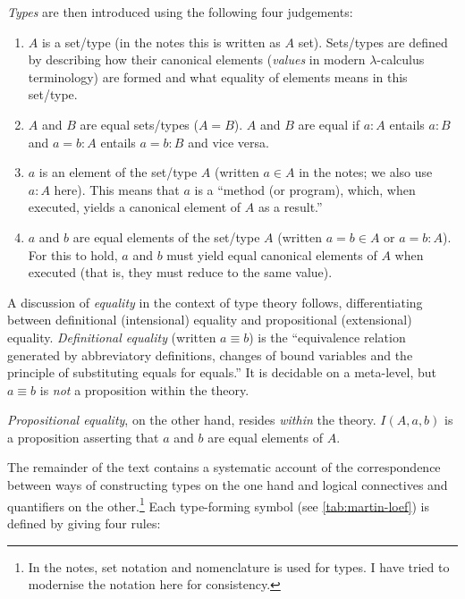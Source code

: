 \documentclass[12pt,toc=bibliography,numbers=noendperiod,
               footnotes=multiple,twoside]{scrartcl}
\begin{document}
\begin{prooftree}
\end{prooftree}

\emph{Types} are then introduced using the following four judgements:

\begin{enumerate}
\item \(A\) is a set/type (in the notes this is written as \(A\) set). Sets/types are defined by describing how their canonical elements (\emph{values} in modern \(\lambda\)-calculus terminology) are formed and what equality of elements means in this set/type.
\item \(A\) and \(B\) are equal sets/types (\(A = B\)). \(A\) and \(B\) are equal if \(a : A\) entails \(a : B\) and \(a = b : A\) entails \(a = b : B\) and vice versa.
\item \(a\) is an element of the set/type \(A\) (written \(a \in A\) in the notes; we also use \(a : A\) here). This means that \(a\) is a \enquote{method (or program), which, when executed, yields a canonical element of \(A\) as a result.}
\item \(a\) and \(b\) are equal elements of the set/type \(A\) (written \(a = b \in A\) or \(a = b : A\)). For this to hold, \(a\) and \(b\) must yield equal canonical elements of \(A\) when executed (that is, they must reduce to the same value).
\end{enumerate}

A discussion of \emph{equality} in the context of type theory follows, differentiating between definitional (intensional) equality and propositional (extensional) equality. \emph{Definitional equality} (written \(a \equiv b\)) is the \enquote{equivalence relation generated by abbreviatory definitions, changes of bound variables and the principle of substituting equals for equals.} It is decidable on a meta-level, but \(a \equiv b\) is \emph{not} a proposition within the theory.

\emph{Propositional equality}, on the other hand, resides \emph{within} the theory. \(I(A, a, b)\) is a proposition asserting that \(a\) and \(b\) are equal elements of \(A\).

The remainder of the text contains a systematic account of the correspondence between ways of constructing types on the one hand and logical connectives and quantifiers on the other.\footnote{In the notes, set notation and nomenclature is used for types. I have tried to modernise the notation here for consistency.} Each type-forming symbol (see \cref{tab:martin-loef}) is defined by giving four rules:
\end{document}
